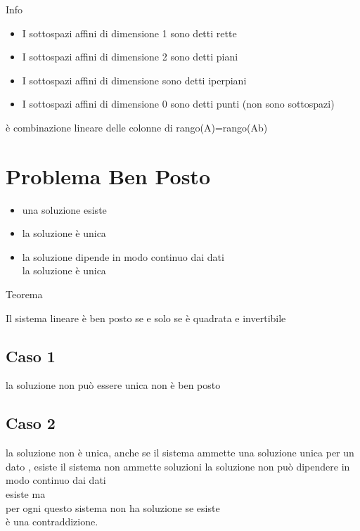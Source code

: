 \documentclass[
]{article}
\providecommand{\tightlist}{%
  \setlength{\itemsep}{0pt}\setlength{\parskip}{0pt}}
\begin{document}
Info

\begin{itemize}
\tightlist
\item
  I sottospazi affini di dimensione 1 sono detti rette
\item
  I sottospazi affini di dimensione 2 sono detti piani
\item
  I sottospazi affini di dimensione {} sono detti iperpiani
\item
  I sottospazi affini di dimensione 0 sono detti punti (non sono
  sottospazi)
\end{itemize}

{} {} è combinazione lineare delle colonne di {} {}
rango(A)=rango(A\textbar b)

{}

\hypertarget{problema-ben-posto}{%
\section{Problema Ben Posto}\label{problema-ben-posto}}

\begin{itemize}
\tightlist
\item
  una soluzione esiste
\item
  la soluzione è unica
\item
  la soluzione dipende in modo continuo dai dati\\
  la soluzione è unica {}
\end{itemize}

Teorema

Il sistema lineare {} è ben posto se e solo se {} è quadrata e
invertibile

\hypertarget{caso-1}{%
\subsection{Caso 1}\label{caso-1}}

{} la soluzione non può essere unica {} non è ben posto

\hypertarget{caso-2}{%
\subsection{Caso 2}\label{caso-2}}

{} la soluzione non è unica, anche se il sistema ammette una soluzione
unica per un dato {}, esiste {} il sistema {} non ammette soluzioni {}
la soluzione non può dipendere in modo continuo dai dati\\
{}{}esiste {} ma {}\\
{}per ogni {} questo sistema non ha soluzione se esiste {}\\
{}è una contraddizione.
\end{document}
